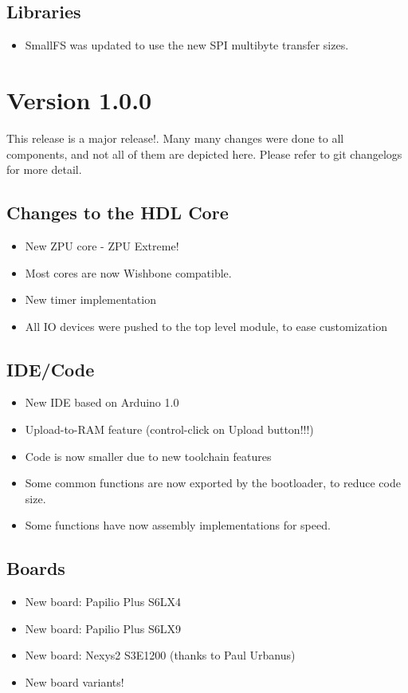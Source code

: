 \subsection*{Libraries}
\begin{itemize}
\item SmallFS was updated to use the new SPI multibyte transfer sizes.
\end{itemize}

\section*{Version 1.0.0}

This release is a major release!. Many many changes were done to all components, and not all of them are
depicted here. Please refer to git changelogs for more detail.

\subsection*{Changes to the HDL Core}

\begin{itemize}
\item New ZPU core - ZPU Extreme!
\item Most cores are now Wishbone compatible.
\item New timer implementation 
\item All IO devices were pushed to the top level module, to ease customization 
\end{itemize}

\subsection*{IDE/Code}

\begin{itemize}
 \item New IDE based on Arduino 1.0
 \item Upload-to-RAM feature (control-click on Upload button!!!)
 \item Code is now smaller due to new toolchain features
 \item Some common functions are now exported by the bootloader, to reduce code size.
 \item Some functions have now assembly implementations for speed.
\end{itemize}

\subsection*{Boards}
\begin{itemize}
 \item New board: Papilio Plus S6LX4
 \item New board: Papilio Plus S6LX9
 \item New board: Nexys2 S3E1200 (thanks to Paul Urbanus)
 \item New board variants!
\end{itemize}

